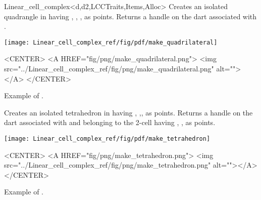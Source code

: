 \begin{ccRefClass}{Linear_cell_complex<d,d2,LCCTraits,Items,Alloc>}
{Creates an isolated quadrangle in   having , , 
  ,  as points.
   Returns a handle on the dart associated with .
}
%
\def\LargFig{.3\textwidth}
  \begin{ccTexOnly}
    \begin{center}
      \texttt{[image: Linear\_cell\_complex\_ref/fig/pdf/make\_quadrilateral]}
    \end{center}
  \end{ccTexOnly}
  \begin{ccHtmlOnly}
    <CENTER>
    <A HREF="fig/png/make_quadrilateral.png">
        <img src="../Linear_cell_complex_ref/fig/png/make_quadrilateral.png" alt=""></A>
    </CENTER>
    \end{ccHtmlOnly}
    \centerline{Example of .}

{Creates an isolated tetrahedron in  having ,
  ,, as points.  Returns a handle on the dart
  associated with  and belonging to the 2-cell having
  , ,  as points.
    }
%
\def\LargFig{.3\textwidth}
  \begin{ccTexOnly}
    \begin{center}
      \texttt{[image: Linear\_cell\_complex\_ref/fig/pdf/make\_tetrahedron]}
    \end{center}
  \end{ccTexOnly}
  \begin{ccHtmlOnly}
    <CENTER>
    <A HREF="fig/png/make_tetrahedron.png">
        <img src="../Linear_cell_complex_ref/fig/png/make_tetrahedron.png" alt=""></A>
    </CENTER>
    \end{ccHtmlOnly}
    \centerline{Example of .}


\end{ccRefClass}
